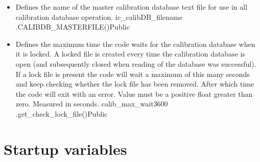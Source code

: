 \begin{itemize}

\item {}
{Defines the name of the master calibration database text file for use in all calibration database operation.}
{ic\_calibDB\_filename}{\masterCALIBDBfile}
{\AllRecipes}{\constantsfile}{\spirouCONST.CALIBDB\_MASTERFILE()}{Public}


\item {}
{Defines the maximum time the code waits for the calibration database when it is locked. A locked file is created every time the calibration database is open (and subsequently closed when reading of the database was successful). If a lock file is present the code will wait a maximum of this many seconds and keep checking whether the lock file has been removed. After which time the code will exit with an error. Value must be a positive float greater than zero. Measured in seconds.}
{calib\_max\_wait}{3600}
{\AllRecipes}{\constantsfile}{\spirouCDB.get\_check\_lock\_file()}{Public}

\end{itemize}




\ifdevguide

\clearpage
\newpage
\section{Startup variables}
\label{ch:variables:startup}

